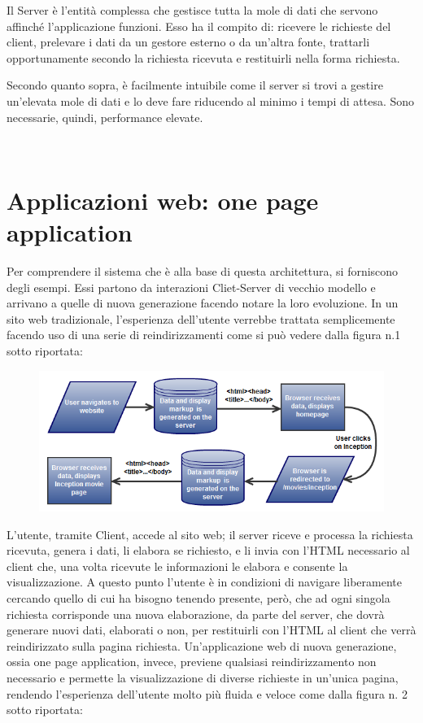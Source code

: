 Il Server è l’entità complessa che gestisce tutta la mole di dati che servono affinché l’applicazione funzioni. Esso ha il compito di: ricevere le richieste del client, prelevare i dati da un gestore esterno o da un’altra fonte, trattarli opportunamente secondo la richiesta ricevuta e restituirli nella forma richiesta.

Secondo quanto sopra, è facilmente intuibile come il server si trovi a gestire un’elevata mole di dati e lo deve fare riducendo al minimo i tempi di attesa. Sono necessarie, quindi, performance elevate.

\newpage

 \section{Applicazioni web: one page application} %
\label{sec:applicazioni_web_one_page_application}

Per comprendere il sistema che è alla base di questa architettura, si forniscono degli esempi. Essi partono da interazioni Cliet-Server di vecchio modello e arrivano a quelle di nuova generazione facendo notare la loro evoluzione. In un sito web tradizionale, l’esperienza dell’utente verrebbe trattata semplicemente facendo uso di una serie di reindirizzamenti come si può vedere dalla figura n.1 sotto riportata:

\begin{figure}[htbp]
\begin{center}
\includegraphics{contents/images/web_app_flow_2_1_}
\end{center}
\caption{}
\label{fig:flow_0}
\end{figure}

L’utente, tramite Client, accede al sito web; il server riceve e processa la richiesta ricevuta, genera i dati, li elabora se richiesto, e li invia con l’HTML necessario al client che, una volta ricevute le informazioni le elabora e consente la visualizzazione. A questo punto l’utente è in condizioni di navigare liberamente cercando quello di cui ha bisogno tenendo presente, però, che ad ogni singola richiesta corrisponde una nuova elaborazione, da parte del server, che dovrà generare nuovi dati, elaborati o non, per restituirli con l’HTML al client che verrà reindirizzato sulla pagina richiesta.
\newpage
Un’applicazione web di nuova generazione, ossia one page application, invece, previene qualsiasi reindirizzamento non necessario e permette la visualizzazione di diverse richieste in un’unica pagina, rendendo l’esperienza dell’utente molto più fluida e veloce come dalla figura n. 2 sotto riportata:

